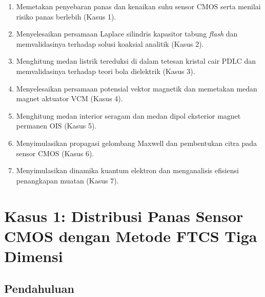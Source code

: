\documentclass[11pt,a4paper]{article}
\begin{document}
\begin{enumerate}[itemsep=1pt,topsep=2pt]
\item Memetakan penyebaran panas dan kenaikan suhu sensor CMOS serta menilai risiko panas berlebih (Kasus 1).
\item Menyelesaikan persamaan Laplace silindris kapasitor tabung \textit{flash} dan memvalidasinya terhadap solusi koaksial analitik (Kasus 2).
\item Menghitung medan listrik tereduksi di dalam tetesan kristal cair PDLC dan memvalidasinya terhadap teori bola dielektrik (Kasus 3).
\item Menyelesaikan persamaan potensial vektor magnetik dan memetakan medan magnet aktuator VCM (Kasus 4).
\item Menghitung medan interior seragam dan medan dipol eksterior magnet permanen OIS (Kasus 5).
\item Menyimulasikan propagasi gelombang Maxwell dan pembentukan citra pada sensor CMOS (Kasus 6).
\item Menyimulasikan dinamika kuantum elektron dan menganalisis efisiensi penangkapan muatan (Kasus 7).
\end{enumerate}

\section{Kasus 1: Distribusi Panas Sensor CMOS dengan Metode FTCS Tiga Dimensi}

\subsection{Pendahuluan}
\end{document}
